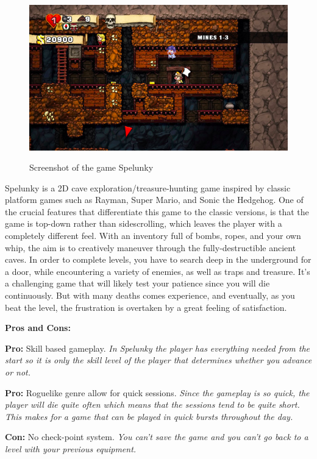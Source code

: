 \documentclass[12p]{article}
\begin{document}
\begin{figure}[ht]
    \center
    \includegraphics[width=1\textwidth]{StateOfTheArtScreenshots/spelunky}
    \label{StateOfTheArt_Screenshots_Spelunky}
    \caption{Screenshot of the game Spelunky \cite{SpelunkyScreenshot}}
\end{figure}

Spelunky is a 2D cave exploration/treasure-hunting game inspired by classic platform games such as Rayman, Super Mario, and Sonic the Hedgehog. One of the crucial features that differentiate this game to the classic versions, is that the game is top-down rather than sidescrolling, which leaves the player with a completely different feel. With an inventory full of bombs, ropes, and your own whip, the aim is to creatively maneuver through the fully-destructible ancient caves. In order to complete levels, you have to search deep in the underground for a door, while encountering a variety of enemies, as well as traps and treasure. It's a challenging game that will likely test your patience since you will die continuously. But with many deaths comes experience, and eventually, as you beat the level, the frustration is overtaken by a great feeling of satisfaction.

\textbf{Pros and Cons:}

\textbf{Pro:} Skill based gameplay. \emph{In Spelunky the player has everything needed from the start so it is only the skill level of the player that determines whether you advance or not.}

\textbf{Pro:} Roguelike genre allow for quick sessions. \emph{Since the gameplay is so quick, the player will die quite often which means that the sessions tend to be quite short. This makes for a game that can be played in quick bursts throughout the day.}

\textbf{Con:} No check-point system. \emph{You can't save the game and you can't go back to a level with your previous equipment.}
\end{document}
